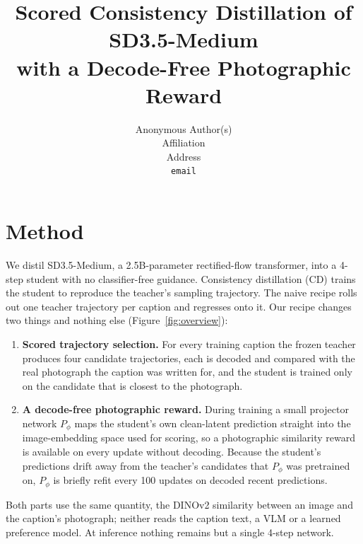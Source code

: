 \documentclass{article} %
\title{Scored Consistency Distillation of SD3.5-Medium\\with a Decode-Free Photographic Reward}
\author{Anonymous Author(s) \\ Affiliation \\ Address \\ \texttt{email}}
\begin{document}
\maketitle


\section{Method}
\label{sec:method}

We distil SD3.5-Medium, a 2.5B-parameter rectified-flow transformer, into a 4-step student with no
classifier-free guidance. Consistency distillation (CD) trains the student to reproduce the teacher's
sampling trajectory. The naive recipe rolls out one teacher trajectory per caption and regresses onto it.
Our recipe changes two things and nothing else (Figure~\ref{fig:overview}):
\begin{enumerate}
\item \textbf{Scored trajectory selection.} For every training caption the frozen teacher produces four
  candidate trajectories, each is decoded and compared with the real photograph the caption was written
  for, and the student is trained only on the candidate that is closest to the photograph.
\item \textbf{A decode-free photographic reward.} During training a small projector network $P_\phi$
  maps the student's own clean-latent prediction straight into the image-embedding space used for
  scoring, so a photographic similarity reward is available on every update without decoding. Because the
  student's predictions drift away from the teacher's candidates that $P_\phi$ was pretrained on, $P_\phi$
  is briefly refit every 100 updates on decoded recent predictions.
\end{enumerate}
Both parts use the same quantity, the DINOv2 similarity between an image and the caption's photograph;
neither reads the caption text, a VLM or a learned preference model. At inference nothing remains but a
single 4-step network.
\end{document}
